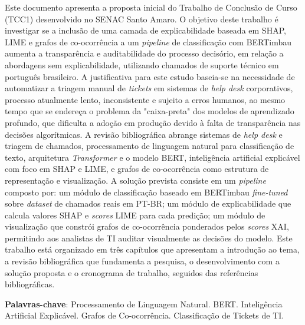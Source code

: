 \documentclass[
    12pt,                %
    openright,           %
    oneside,             %
    a4paper,             %
    english,             %
    brazil               %
]{abntex2}
\begin{document}

\frenchspacing

\pretextual

\imprimircapa

\imprimirfolhaderosto

\begin{resumo}
Este documento apresenta a proposta inicial do Trabalho de Conclusão de Curso (TCC1) desenvolvido no SENAC Santo Amaro. O objetivo deste trabalho é investigar se a inclusão de uma camada de explicabilidade baseada em SHAP, LIME e grafos de co-ocorrência a um \textit{pipeline} de classificação com BERTimbau aumenta a transparência e auditabilidade do processo decisório, em relação a abordagens sem explicabilidade, utilizando chamados de suporte técnico em português brasileiro. A justificativa para este estudo baseia-se na necessidade de automatizar a triagem manual de \textit{tickets} em sistemas de \textit{help desk} corporativos, processo atualmente lento, inconsistente e sujeito a erros humanos, ao mesmo tempo que se endereça o problema da "caixa-preta" dos modelos de aprendizado profundo, que dificulta a adoção em produção devido à falta de transparência nas decisões algorítmicas. A revisão bibliográfica abrange sistemas de \textit{help desk} e triagem de chamados, processamento de linguagem natural para classificação de texto, arquitetura \textit{Transformer} e o modelo BERT, inteligência artificial explicável com foco em SHAP e LIME, e grafos de co-ocorrência como estrutura de representação e visualização. A solução prevista consiste em um \textit{pipeline} composto por: um módulo de classificação baseado em BERTimbau \textit{fine-tuned} sobre \textit{dataset} de chamados reais em PT-BR; um módulo de explicabilidade que calcula valores SHAP e \textit{scores} LIME para cada predição; um módulo de visualização que constrói grafos de co-ocorrência ponderados pelos \textit{scores} XAI, permitindo aos analistas de TI auditar visualmente as decisões do modelo. Este trabalho está organizado em três capítulos que apresentam a introdução ao tema, a revisão bibliográfica que fundamenta a pesquisa, o desenvolvimento com a solução proposta e o cronograma de trabalho, seguidos das referências bibliográficas.

\vspace{\onelineskip}

\noindent
\textbf{Palavras-chave}: Processamento de Linguagem Natural. BERT. Inteligência Artificial Explicável. Grafos de Co-ocorrência. Classificação de Tickets de TI.
\end{resumo}
\end{document}
